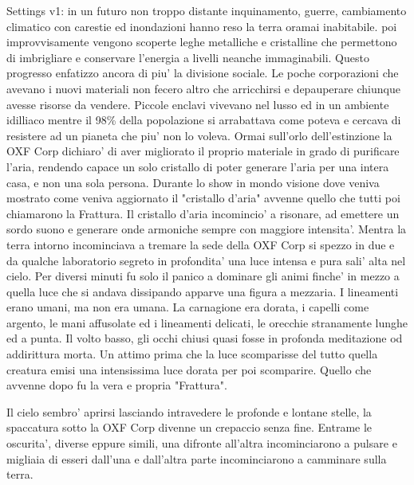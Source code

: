\documentclass[12pt,a4paper,twoside,openany]{book}
\begin{document}
\pagebreak



\begin{multicols}{2}
	
\end{multicols}

\pagebreak

Settings v1:  in un futuro non troppo distante inquinamento, guerre, cambiamento climatico con carestie ed inondazioni hanno reso la terra oramai inabitabile. poi improvvisamente vengono scoperte leghe metalliche e cristalline che permettono di imbrigliare e conservare l'energia a livelli neanche immaginabili.
Questo progresso enfatizzo ancora di piu' la divisione sociale. Le poche corporazioni che avevano i nuovi materiali non fecero altro che arricchirsi e depauperare chiunque avesse risorse da vendere.
Piccole enclavi vivevano nel lusso ed in un ambiente idilliaco mentre il 98\% della popolazione si arrabattava come poteva e cercava di resistere ad un pianeta che piu' non lo voleva.
Ormai sull'orlo dell'estinzione la OXF Corp dichiaro' di aver migliorato il proprio materiale in grado di purificare l'aria, rendendo capace un solo cristallo di poter generare l'aria per una intera casa, e non una sola persona.
Durante lo show in mondo visione dove veniva mostrato come veniva aggiornato il "cristallo d'aria" avvenne quello che tutti poi chiamarono la Frattura. 
Il cristallo d'aria incomincio' a risonare, ad emettere un sordo suono e generare onde armoniche sempre con maggiore intensita'. Mentra la terra intorno incominciava a tremare la sede della OXF Corp si spezzo in due e da qualche laboratorio segreto in profondita' una luce intensa e pura sali' alta nel cielo. Per diversi minuti fu solo il panico a dominare gli animi finche' in mezzo a quella luce che si andava dissipando apparve una figura a mezzaria. I lineamenti erano umani, ma non era umana. La carnagione era dorata, i capelli come argento, le mani affusolate ed i lineamenti delicati, le orecchie stranamente lunghe ed a punta.
Il volto basso, gli occhi chiusi quasi fosse in profonda meditazione od addirittura morta.
Un attimo prima che la luce scomparisse del tutto quella creatura emisi una intensissima luce dorata per poi scomparire.
Quello che avvenne dopo fu la vera e propria "Frattura".

Il cielo sembro' aprirsi lasciando intravedere le profonde e lontane stelle, la spaccatura sotto la OXF Corp divenne un crepaccio senza fine.
Entrame le oscurita', diverse eppure simili, una difronte all'altra incominciarono a pulsare e migliaia di esseri dall'una e dall'altra parte incominciarono a camminare sulla terra.
\end{document}
